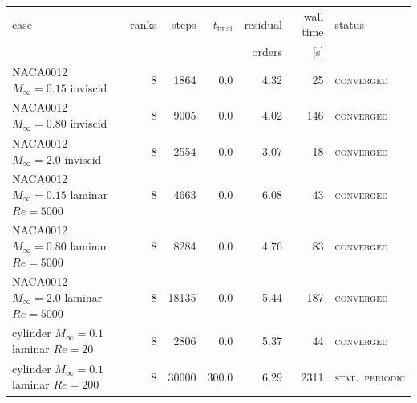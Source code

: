 \footnotesize
\begin{tabular}{lrrrrrl}
\toprule
case & ranks & steps & $t_{\mathrm{final}}$ & residual & wall time & status\\
 & & & & orders & [s] & \\
\midrule
NACA0012 $M_\infty=0.15$ inviscid & 8 & 1864 & 0.0 & 4.32 & 25 & \textsc{converged}\\
NACA0012 $M_\infty=0.80$ inviscid & 8 & 9005 & 0.0 & 4.02 & 146 & \textsc{converged}\\
NACA0012 $M_\infty=2.0$ inviscid & 8 & 2554 & 0.0 & 3.07 & 18 & \textsc{converged}\\
NACA0012 $M_\infty=0.15$ laminar $Re=5000$ & 8 & 4663 & 0.0 & 6.08 & 43 & \textsc{converged}\\
NACA0012 $M_\infty=0.80$ laminar $Re=5000$ & 8 & 8284 & 0.0 & 4.76 & 83 & \textsc{converged}\\
NACA0012 $M_\infty=2.0$ laminar $Re=5000$ & 8 & 18135 & 0.0 & 5.44 & 187 & \textsc{converged}\\
cylinder $M_\infty=0.1$ laminar $Re=20$ & 8 & 2806 & 0.0 & 5.37 & 44 & \textsc{converged}\\
cylinder $M_\infty=0.1$ laminar $Re=200$ & 8 & 30000 & 300.0 & 6.29 & 2311 & \textsc{stat.\ periodic}\\
\bottomrule
\end{tabular}
